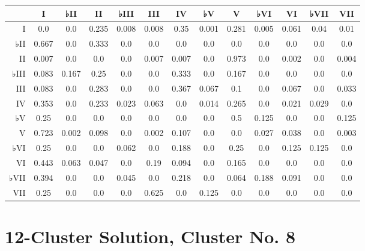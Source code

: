 \begin{table}[htbp]
\begin{minipage}{\linewidth}
\setlength{\tymax}{0.5\linewidth}
\centering
\small
\begin{tabulary}{\textwidth}{@{}RCCCCCCCCCCCC@{}} \toprule
&I&♭II&II&♭III&III&IV&♭V&V&♭VI&VI&♭VII&VII\\
\midrule
I&0.0&0.0&0.235&0.008&0.008&0.35&0.001&0.281&0.005&0.061&0.04&0.01\\
♭II&0.667&0.0&0.333&0.0&0.0&0.0&0.0&0.0&0.0&0.0&0.0&0.0\\
II&0.007&0.0&0.0&0.0&0.007&0.007&0.0&0.973&0.0&0.002&0.0&0.004\\
♭III&0.083&0.167&0.25&0.0&0.0&0.333&0.0&0.167&0.0&0.0&0.0&0.0\\
III&0.083&0.0&0.283&0.0&0.0&0.367&0.067&0.1&0.0&0.067&0.0&0.033\\
IV&0.353&0.0&0.233&0.023&0.063&0.0&0.014&0.265&0.0&0.021&0.029&0.0\\
♭V&0.25&0.0&0.0&0.0&0.0&0.0&0.0&0.5&0.125&0.0&0.0&0.125\\
V&0.723&0.002&0.098&0.0&0.002&0.107&0.0&0.0&0.027&0.038&0.0&0.003\\
♭VI&0.25&0.0&0.0&0.062&0.0&0.188&0.0&0.25&0.0&0.125&0.125&0.0\\
VI&0.443&0.063&0.047&0.0&0.19&0.094&0.0&0.165&0.0&0.0&0.0&0.0\\
♭VII&0.394&0.0&0.0&0.045&0.0&0.218&0.0&0.064&0.188&0.091&0.0&0.0\\
VII&0.25&0.0&0.0&0.0&0.625&0.0&0.125&0.0&0.0&0.0&0.0&0.0\\

\bottomrule

\end{tabulary}
\end{minipage}
\end{table}

\section{12-Cluster Solution, Cluster No. 8}
\label{12-clustersolutionclusterno.8}


